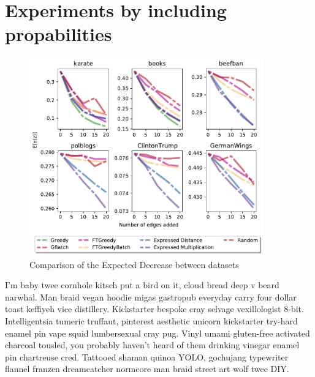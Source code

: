\clearpage


\section{Experiments by including propabilities}
\label{probexperiment}

\begin{figure}[!htbp]
	\centering
	\captionsetup{justification=centering,margin=2cm}
	\includegraphics[width=0.90\textwidth]{Figures/embeddings_small}
	\caption{Comparison of the Expected Decrease between datasets}
	\label{fig:embeddings_snmalll}
\end{figure}

I'm baby twee cornhole kitsch put a bird on it, cloud bread deep v beard narwhal. Man braid vegan hoodie migas gastropub everyday carry four dollar toast keffiyeh vice distillery. Kickstarter bespoke cray selvage vexillologist 8-bit. Intelligentsia tumeric truffaut, pinterest aesthetic unicorn kickstarter try-hard enamel pin vape squid lumbersexual cray pug. Vinyl umami gluten-free activated charcoal tousled, you probably haven't heard of them drinking vinegar enamel pin chartreuse cred. Tattooed shaman quinoa YOLO, gochujang typewriter flannel franzen dreamcatcher normcore man braid street art wolf twee DIY.

\clearpage

